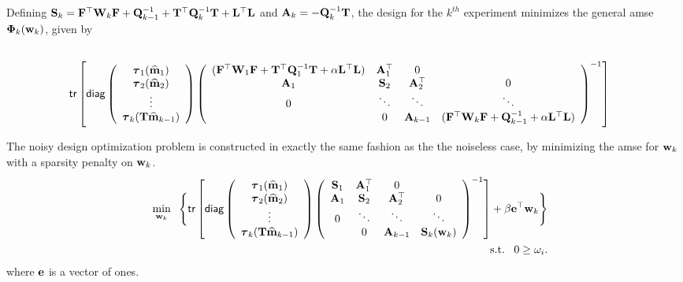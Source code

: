 \documentclass[english]{siamltex}
\newcommand{\bfA}	{{\bf{A}}}
\newcommand{\bfF}	{{\bf{F}}}
\newcommand{\bfL}	{{\bf{L}}}
\newcommand{\bfQ}	{{\bf{Q}}}
\newcommand{\bfS}	{{\bf{S}}}
\newcommand{\bfT}	{{\bf{T}}}
\newcommand{\bfW}	{{\bf{W}}}
\newcommand{\bfe}	{{\bf{e}}}
\newcommand{\bfm}	{{\bf{m}}}
\newcommand{\bfw}	{{\bf{w}}}
\newcommand{\bfPhi}     {{\boldsymbol \Phi}}
\newcommand{\bftau}      {{\boldsymbol \tau}}
\newcommand{\bfmhat}    {{\widehat{\bfm}}}
\newcommand{\LtL}       { \bfL^{\top}\bfL}
\renewcommand{\bfmhat}	{\widehat{\bf m}}
\begin{document}
{Defining $\bfS_k = \bfF^{\top}\bfW_{k}\bfF + \bfQ^{-1}_{k-1} + \bfT^{\top}\bfQ^{-1}_{k}\bfT + \LtL$  and $\bfA_k = -\bfQ^{-1}_k \bfT$, the design for the $k^{th}$ experiment minimizes  the  general {\sf amse} $\bfPhi_k(\bfw_k)$, given by
\begin{eqnarray}
\label{eq:noisyPhi}
\\
\nonumber
&{\sf tr} \left[{\sf diag}\left( \begin{array}{c}
\bftau_1(\bfmhat_1) \\ 
\bftau_2(\bfmhat_2)  \\
\vdots \\
\bftau_k(\bfT\bfmhat_{k-1})\end{array}\right)
\left(\begin{array}{cccc}
  (\bfF^{\top}\bfW_{1}\bfF  + \bfT^{\top}\bfQ^{-1}_{1}\bfT + \alpha\LtL) &  \bfA^{\top}_1 & 0 & \\
 \bfA_1 & \bfS_2 & \bfA^{\top}_2 & 0 \\
 0 & \ddots & \ddots & \ddots \\
 & 0 & \bfA_{k-1} &  (\bfF^{\top}\bfW_{k}\bfF + \bfQ^{-1}_{k-1} + \alpha\LtL) 
  \end{array}\right)^{-1}\right]
\end{eqnarray}
  
The noisy design optimization problem is constructed in exactly the same fashion as the the noiseless case, by minimizing the {\sf amse} for $\bfw_k$ with a sparsity penalty on $\bfw_k$. 
\begin{eqnarray*}
 &&\min_{\bfw_k}\;\;\Bigg \{{\sf tr} \left[{\sf diag}\left( \begin{array}{c}
\bftau_1(\bfmhat_1) \\ 
\bftau_2(\bfmhat_2)  \\
\vdots \\
\bftau_k(\bfT\bfmhat_{k-1})\end{array}\right)
\left(\begin{array}{cccc}
 \bfS_1 &  \bfA^{\top}_1 & 0 & \\
 \bfA_1 & \bfS_2 & \bfA^{\top}_2 & 0 \\
 0 & \ddots & \ddots & \ddots \\
 & 0 & \bfA_{k-1} & \bfS_k(\bfw_k)  \end{array}\right)^{-1}\right] + \beta \bfe^{\top}\bfw_k \Bigg \}\\
 &&\text{ s.t.} \;\;\;0 \geq \omega_i.
\end{eqnarray*}
where $\bfe$ is a vector of ones.

}
\end{document}
